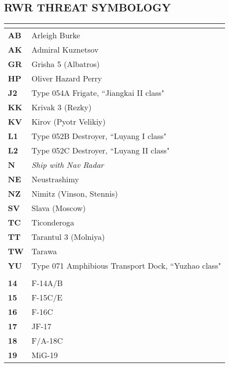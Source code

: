 \documentclass[8pt,usenames,dvipsnames,twoside]{article}
\begin{document}
\begin{multicols*}{2}
		\subsection{RWR THREAT SYMBOLOGY}
		\begin{center}
			\begin{tabular}{l | p{4cm} }
				\toprule
				\multicolumn{2}{c}{\blue{SHIPS}} \\
				\toprule
				\textbf{AB} & Arleigh Burke \\
				\midrule
				\textbf{AK} & Admiral Kuznetsov \\
				\midrule
				\textbf{GR} & Grisha 5 (Albatros) \\
				\midrule
				\textbf{HP} & Oliver Hazard Perry \\
				\midrule
				\textbf{J2} & Type 054A Frigate, ``Jiangkai II class" \\
				\midrule
				\textbf{KK} & Krivak 3 (Rezky) \\
				\midrule
				\textbf{KV} & Kirov (Pyotr Velikiy) \\
				\midrule
				\textbf{L1} & Type 052B Destroyer, ``Luyang I class" \\
				\midrule
				\textbf{L2} & Type 052C Destroyer, ``Luyang II class" \\
				\midrule
				\textbf{N} & \emph{Ship with Nav Radar} \\
				\midrule
				\textbf{NE} & Neustrashimy \\
				\midrule
				\textbf{NZ} & Nimitz (Vinson, Stennis) \\
				\midrule
				\textbf{SV} & Slava (Moscow) \\
				\midrule
				\textbf{TC} & Ticonderoga \\
				\midrule
				\textbf{TT} & Tarantul 3 (Molniya) \\
				\midrule
				\textbf{TW} & Tarawa \\
				\midrule
				\textbf{YU} & Type 071 Amphibious Transport Dock, ``Yuzhao class" \\
				\midrule
				\multicolumn{2}{c}{\blue{AIRCRAFT}} \\
				\toprule
				\textbf{14} & F-14A/B \\
				\midrule
				\textbf{15} & F-15C/E \\
				\midrule
				\textbf{16} & F-16C \\
				\midrule
				\textbf{17} & JF-17 \\
				\midrule
				\textbf{18} & F/A-18C \\
				\midrule
				\textbf{19} & MiG-19 \\

\end{tabular}
\end{center}
\end{multicols*}
\end{document}
